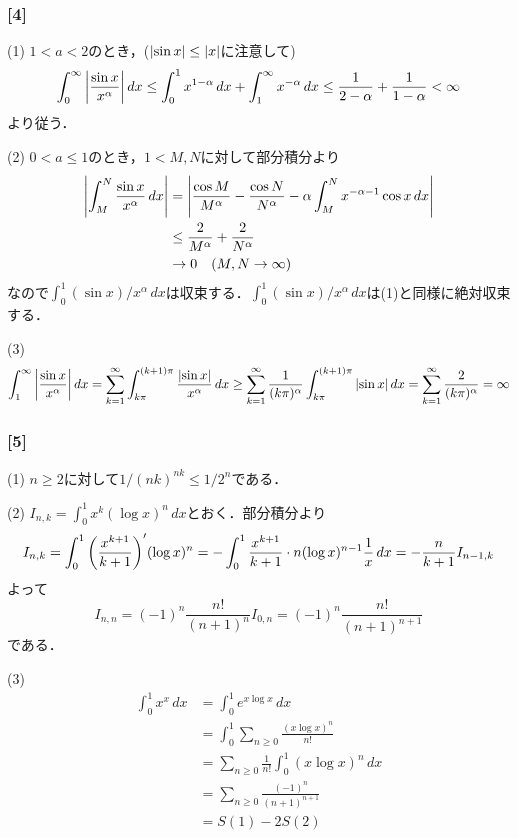 \documentclass[a4j]{ltjsarticle}
\newcommand{\1}{\mathbbm{1}}
\numberwithin{equation}{section}
\theoremstyle{definition}
\begin{document}
\subsubsection*{[4]}
(1) $1<a<2$のとき，($\abs{\sin x}\leq \abs{x}$に注意して)
\begin{equation}
    \int_{0}^\infty \abs{\frac{\sin x}{x^{\alpha}}}\,dx\leq \int_{0}^{1}x^{1-\alpha}\,dx+\int_{1}^\infty x^{-\alpha}\,dx\leq \frac{1}{2-\alpha}+\frac{1}{1-\alpha}<\infty 
\end{equation}
より従う．

(2) $0<a\leq 1$のとき，$1<M,N$に対して部分積分より
\begin{align}
    \abs{\int_M^N \frac{\sin x}{x^\alpha}\,dx}
    &=\abs{\frac{\cos M}{M^\alpha}-\frac{\cos N}{N^\alpha}-\alpha\int_{M}^{N}x^{-\alpha-1}\cos x\,dx}\\
    &\leq \frac{2}{M^\alpha}+\frac{2}{N^\alpha}\\
    &\to 0 \quad (M,N\to\infty)
\end{align}
なので$\int_{0}^1(\sin x)/x^\alpha\,dx$は収束する．$\int_0^1(\sin x)/x^\alpha\,dx$は(1)と同様に絶対収束する．

(3) 
\begin{equation}
    \int_{1}^\infty \abs{\frac{\sin x}{x^\alpha}}\,dx=\sum_{k=1}^\infty \int_{k\pi}^{(k+1)\pi}\frac{\abs{\sin x}}{x^\alpha}\,dx\geq \sum_{k=1}^\infty \frac{1}{(k\pi)^\alpha}\int_{k\pi}^{(k+1)\pi}\abs{\sin x}\,dx=\sum_{k=1}^\infty \frac{2}{(k\pi)^\alpha}=\infty
\end{equation}
\subsubsection*{[5]}
(1) $n\geq 2$に対して$1/(nk)^{nk}\leq 1/2^n$である．

(2) $I_{n,k}=\int_{0}^1 x^k (\log x)^n\,dx$とおく．部分積分より
\begin{equation}
    I_{n,k}=\int_{0}^1\qty(\frac{x^{k+1}}{k+1})'(\log x)^n=-\int_{0}^1\frac{x^{k+1}}{k+1}\cdot n(\log x)^{n-1}\frac{1}{x}\,dx=-\frac{n}{k+1}I_{n-1,k}
\end{equation}
よって 
\begin{equation}
    I_{n,n}=(-1)^n\frac{n!}{(n+1)^n}I_{0,n}=(-1)^n\frac{n!}{(n+1)^{n+1}}
\end{equation}
である．

(3) 
\begin{align}
    \int_{0}^{1}x^{x}\,dx&=\int_0^1 e^{x\log x}\,dx\\
    &=\int_{0}^1 \sum_{n\geq 0}\frac{(x\log x)^n}{n!}\\
    &=\sum_{n\geq0}\frac{1}{n!}\int_{0}^1 (x\log x)^n\,dx\\
    &=\sum_{n\geq 0}\frac{(-1)^n}{(n+1)^{n+1}}\\
    &=S(1)-2S(2)
\end{align}
\end{document}
